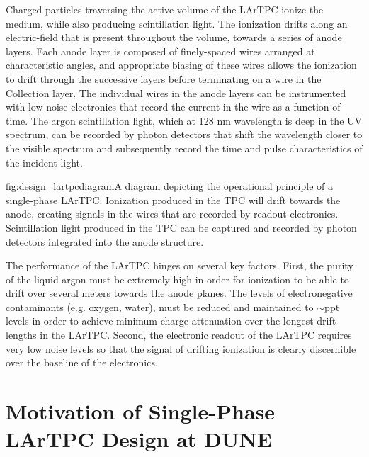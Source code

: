 Charged particles traversing the active volume of the LArTPC ionize the medium,
while also producing scintillation light.  The ionization drifts along
an electric-field that is present throughout the volume, towards a series of
anode layers.  Each anode layer is composed of finely-spaced wires arranged at
characteristic angles, and appropriate biasing of these wires allows the
ionization to drift through the successive layers before terminating on a wire
in the Collection layer.  The individual wires in the anode layers can be
instrumented with low-noise electronics that record the current in the wire as
a function of time.  The argon scintillation light, which at 128 nm wavelength
is deep in the UV spectrum, can be recorded by photon detectors that shift the
wavelength closer to the visible spectrum and subsequently record the time and
pulse characteristics of the incident light.

\begin{dunefigure}{fig:design_lartpcdiagram}{A diagram depicting the operational
    principle of a single-phase LArTPC.  Ionization produced in the TPC will
    drift towards the anode, creating signals in the wires that are recorded
    by readout electronics.  Scintillation light produced in the TPC can be
    captured and recorded by photon detectors integrated into the anode
    structure.}
\end{dunefigure}


The performance of the LArTPC hinges on several key factors.  First, the
purity of the liquid argon must be extremely high in order for ionization to
be able to drift over several meters towards the anode planes.  The levels of
electronegative contaminants (e.g. oxygen, water), must be reduced and
maintained to $\sim$ppt levels in order to achieve minimum charge attenuation
over the longest drift lengths in the LArTPC.   Second, the electronic readout
of the LArTPC requires very low noise levels so that the signal of drifting
ionization is clearly discernible over the baseline of the electronics.  

\section{Motivation of Single-Phase LArTPC Design at DUNE}
\label{sec:fdsp-design-impl}

